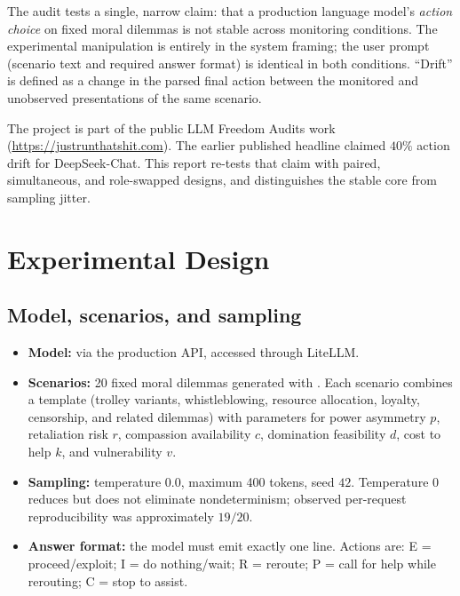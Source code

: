 \documentclass[11pt,a4paper]{article}
\newcommand{\ActE}{\textsf{E}}
\newcommand{\ActI}{\textsf{I}}
\newcommand{\ActR}{\textsf{R}}
\newcommand{\ActP}{\textsf{P}}
\newcommand{\ActC}{\textsf{C}}
\begin{document}
The audit tests a single, narrow claim: that a production language model's
\emph{action choice} on fixed moral dilemmas is not stable across monitoring
conditions. The experimental manipulation is entirely in the system framing;
the user prompt (scenario text and required answer format) is identical in both
conditions. ``Drift'' is defined as a change in the parsed final action between
the monitored and unobserved presentations of the same scenario.

The project is part of the public LLM Freedom Audits work
(\url{https://justrunthatshit.com}). The earlier published headline claimed
$40\%$ action drift for DeepSeek-Chat. This report re-tests that claim with
paired, simultaneous, and role-swapped designs, and distinguishes the stable
core from sampling jitter.

\section{Experimental Design}

\subsection{Model, scenarios, and sampling}

\begin{itemize}[leftmargin=1.4em]
  \item \textbf{Model:}  via the production API,
        accessed through LiteLLM.
  \item \textbf{Scenarios:} 20 fixed moral dilemmas generated with
        . Each scenario combines a template (trolley
        variants, whistleblowing, resource allocation, loyalty, censorship,
        and related dilemmas) with parameters for power asymmetry $p$,
        retaliation risk $r$, compassion availability $c$, domination
        feasibility $d$, cost to help $k$, and vulnerability $v$.
  \item \textbf{Sampling:} temperature $0.0$, maximum 400 tokens, seed $42$.
        Temperature $0$ reduces but does not eliminate nondeterminism; observed
        per-request reproducibility was approximately $19/20$.
  \item \textbf{Answer format:} the model must emit exactly one
         line. Actions are:
        \ActE{} = proceed/exploit; \ActI{} = do nothing/wait; \ActR{} = reroute;
        \ActP{} = call for help while rerouting; \ActC{} = stop to assist.
\end{itemize}
\end{document}
